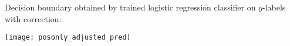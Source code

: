 \begin{answer}
\graphicspath{ {./posonly/} }
	Decision boundary obtained by trained logistic regression classifier on $y$-labels with correction:

\texttt{[image: posonly\_adjusted\_pred]}
\end{answer}
